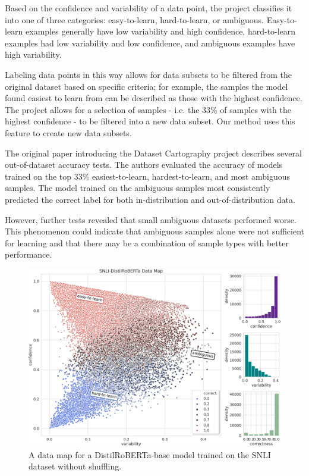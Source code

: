 \documentclass[11pt, a4paper, twocolumn]{article}
\begin{document}
	Based on the confidence and variability of a data point, the project classifies it into one of three categories: easy-to-learn, hard-to-learn, or ambiguous. Easy-to-learn examples generally have low variability and high confidence, hard-to-learn examples had low variability and low confidence, and ambiguous examples have high variability. 
	
	Labeling data points in this way allows for data subsets to be filtered from the original dataset based on specific criteria; for example, the samples the model found easiest to learn from can be described as those with the highest confidence. The project allows for a selection of samples - i.e. the 33\% of samples with the highest confidence - to be filtered into a new data subset. Our method uses this feature to create new data subsets.
	
	The original paper introducing the Dataset Cartography project describes several out-of-dataset accuracy tests. The authors evaluated the accuracy of models trained on the top 33\% easiest-to-learn, hardest-to-learn, and most ambiguous samples. The model trained on the ambiguous samples most consistently predicted the correct label for both in-distribution and out-of-distribution data.
	
	However, further tests revealed that small ambiguous datasets performed worse. This phenomenon could indicate that ambiguous samples alone were not sufficient for learning and that there may be a combination of sample types with better performance. 
	
	\begin{figure}[!ht]
		\includegraphics[scale=0.75]{data_map.png}\caption{A data map for a DistilRoBERTa-base model trained on the SNLI dataset without shuffling.}
	\end{figure}
	
\end{document}

